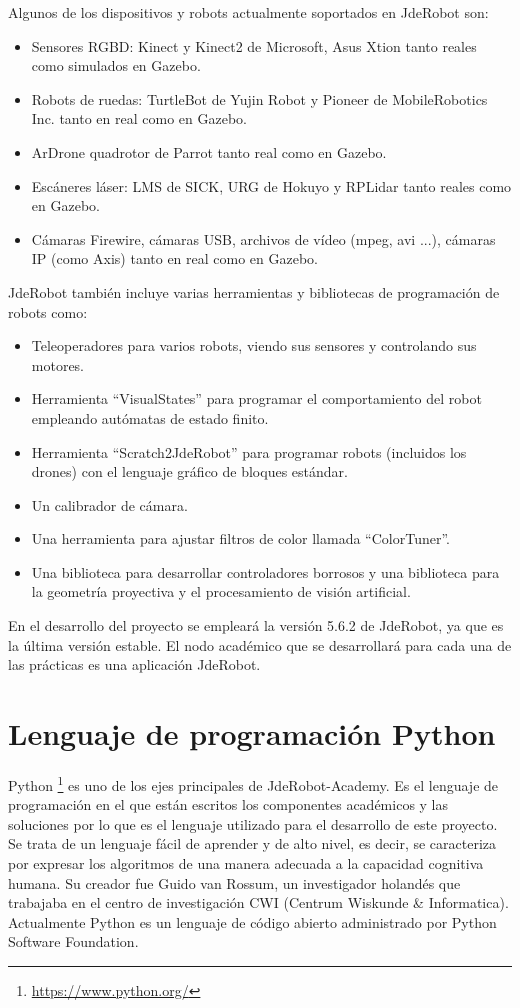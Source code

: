 Algunos de los dispositivos y robots actualmente soportados en JdeRobot son:
\begin{itemize}
	\item Sensores RGBD: Kinect y Kinect2 de Microsoft, Asus Xtion tanto reales como simulados en Gazebo.
	\item Robots de ruedas: TurtleBot de Yujin Robot y Pioneer de MobileRobotics Inc. tanto en real como en Gazebo.
	\item ArDrone quadrotor de Parrot tanto real como en Gazebo.
	\item Escáneres láser: LMS de SICK, URG de Hokuyo y RPLidar tanto reales como en Gazebo.
	\item Cámaras Firewire, cámaras USB, archivos de vídeo (mpeg, avi ...), cámaras IP (como Axis) tanto en real como en Gazebo.
\end{itemize}


JdeRobot también incluye varias herramientas y bibliotecas de programación de robots como:
\begin{itemize}
	\item Teleoperadores para varios robots, viendo sus sensores y controlando sus motores. 
	\item Herramienta ``VisualStates'' para programar el comportamiento del robot empleando autómatas
de estado finito.
	\item Herramienta ``Scratch2JdeRobot'' para programar robots (incluidos los drones) con el lenguaje gráfico de bloques estándar.
	\item Un calibrador de cámara.
	\item Una herramienta para ajustar filtros de color llamada ``ColorTuner''.
	\item Una biblioteca para desarrollar controladores borrosos y una biblioteca para la geometría proyectiva y el procesamiento de visión artificial.
\end{itemize}

En el desarrollo del proyecto se empleará la versión 5.6.2 de JdeRobot, ya que es la última versión estable. El nodo académico que se desarrollará para cada una de las prácticas es una aplicación JdeRobot.

\section{Lenguaje de programación Python}

Python \footnote{\url{https://www.python.org/}} es uno de los ejes principales de JdeRobot-Academy. Es el lenguaje de programación en el que están escritos los componentes académicos y las soluciones por lo que es el lenguaje utilizado para el desarrollo de este proyecto. Se trata de un lenguaje fácil de aprender y de alto nivel, es decir, se caracteriza por expresar los algoritmos de una manera adecuada a la capacidad cognitiva humana. Su creador fue Guido van Rossum, un investigador holandés que trabajaba en el centro de investigación CWI (Centrum Wiskunde \& Informatica). Actualmente Python es un lenguaje de código abierto administrado por Python Software Foundation. \\

